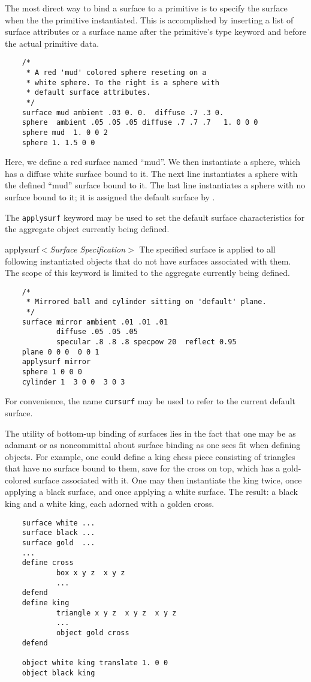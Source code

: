 The
most direct way to bind a surface to a primitive
is to specify the surface when the
the primitive instantiated.
This is accomplished
by inserting a list of surface attributes or a surface name after
the primitive's type keyword and before the actual primitive data.

\begin{verbatim}
    /*
     * A red 'mud' colored sphere reseting on a
     * white sphere. To the right is a sphere with
     * default surface attributes.
     */
    surface mud ambient .03 0. 0.  diffuse .7 .3 0.
    sphere  ambient .05 .05 .05 diffuse .7 .7 .7   1. 0 0 0
    sphere mud  1. 0 0 2
    sphere 1. 1.5 0 0
\end{verbatim}

Here, we define a red surface named ``mud''.  We then instantiate
a sphere, which has a diffuse white surface bound to it.  The
next line instantiates a sphere with the defined ``mud'' surface bound
to it.  The last line instantiates a sphere with no surface bound to it;
it is assigned the default surface by {\rayshade}.

The {\tt applysurf} keyword may be used to set the default surface
characteristics for the aggregate object currently being defined.

\begin{defkey}{applysurf}{$<${\em Surface Specification}$>$}
The specified surface is applied to all following
instantiated objects that do not have surfaces associated with them.
The scope of this keyword is limited to the aggregate currently
being defined.
\end{defkey}

\begin{verbatim}
    /*
     * Mirrored ball and cylinder sitting on 'default' plane.
     */
    surface mirror ambient .01 .01 .01
            diffuse .05 .05 .05
            specular .8 .8 .8 specpow 20  reflect 0.95
    plane 0 0 0  0 0 1
    applysurf mirror
    sphere 1 0 0 0
    cylinder 1  3 0 0  3 0 3
\end{verbatim}

For convenience, the name {\tt cursurf} may be used to refer to the
current default surface.

The utility of bottom-up binding of surfaces lies in the fact that
one may be as adamant or as noncommittal about
surface binding as one sees fit when defining objects.  For example,
one could define a king chess piece consisting of triangles that have no
surface bound to them, save for the cross on top, which has
a gold-colored surface associated with it.  One may then instantiate
the king twice, once applying a black surface, and once applying
a white surface.  The result:  a black king and a white king, each
adorned with a golden cross.

\begin{verbatim}
    surface white ...
    surface black ...
    surface gold  ...
    ...
    define cross
            box x y z  x y z
            ...
    defend
    define king
            triangle x y z  x y z  x y z
            ...
            object gold cross
    defend

    object white king translate 1. 0 0
    object black king
\end{verbatim}
